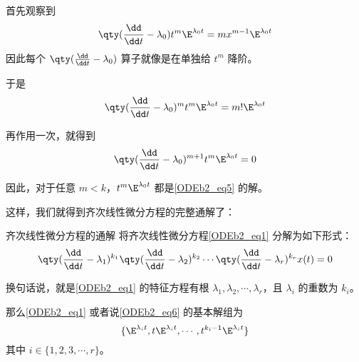 首先观察到
\begin{equation}
\qty(\frac{\dd}{\dd t}-\lambda_0)t^m\E^{\lambda_0 t}=mx^{m-1}\E^{\lambda_0 t}
\end{equation}
因此每个 $\qty(\frac{\dd}{\dd t}-\lambda_0)$ 算子就像是在单独给 $t^m$ 降阶。

于是
\begin{equation}
\qty(\frac{\dd}{\dd t}-\lambda_0)^mt^m\E^{\lambda_0 t}=m!\E^{\lambda_0 t}
\end{equation}

再作用一次，就得到
\begin{equation}
\qty(\frac{\dd}{\dd t}-\lambda_0)^{m+1}t^m\E^{\lambda_0 t}=0
\end{equation}

因此，对于任意 $m<k$，$t^m\E^{\lambda_0 t}$ 都是\autoref{ODEb2_eq5} 的解。

这样，我们就得到齐次线性微分方程的完整通解了：

\begin{theorem}{齐次线性微分方程的通解}
将齐次线性微分方程\autoref{ODEb2_eq1} 分解为如下形式：
\begin{equation}\label{ODEb2_eq6}
\qty(\frac{\dd}{\dd t}-\lambda_1)^{k_1}\qty(\frac{\dd}{\dd t}-\lambda_2)^{k_2}\cdots\qty(\frac{\dd}{\dd t}-\lambda_r)^{k_r}x(t)=0
\end{equation}

换句话说，就是\autoref{ODEb2_eq1} 的特征方程有根 $\lambda_1, \lambda_2, \cdots, \lambda_r$，且 $\lambda_i$ 的重数为 $k_i$。

那么\autoref{ODEb2_eq1} 或者说\autoref{ODEb2_eq6} 的基本解组为
\begin{equation}
\{
    \E^{\lambda_i t}, t\E^{\lambda_i t}, \cdots, t^{k_i-1}\E^{\lambda_i t}
\}
\end{equation}
其中 $i\in\{1, 2, 3, \cdots, r\}$。



\end{theorem}










